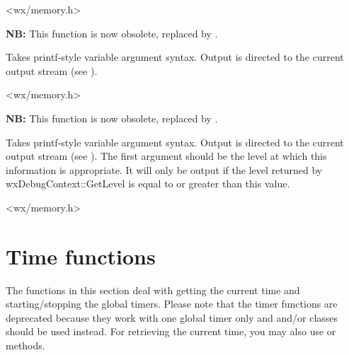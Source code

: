 
<wx/memory.h>


\label{wxtrace}


{\bf NB:} This function is now obsolete, replaced by .

Takes printf-style variable argument syntax. Output
is directed to the current output stream (see ).


<wx/memory.h>


\label{wxtracelevel}


{\bf NB:} This function is now obsolete, replaced by .

Takes printf-style variable argument syntax. Output
is directed to the current output stream (see ).
The first argument should be the level at which this information is appropriate.
It will only be output if the level returned by wxDebugContext::GetLevel is equal to or greater than
this value.


<wx/memory.h>



\section{Time functions}\label{timefunctions}

The functions in this section deal with getting the current time and
starting/stopping the global timers. Please note that the timer functions are
deprecated because they work with one global timer only and
 and/or  classes
should be used instead. For retrieving the current time, you may also use
 or
 methods.


\label{wxgetelapsedtime}


